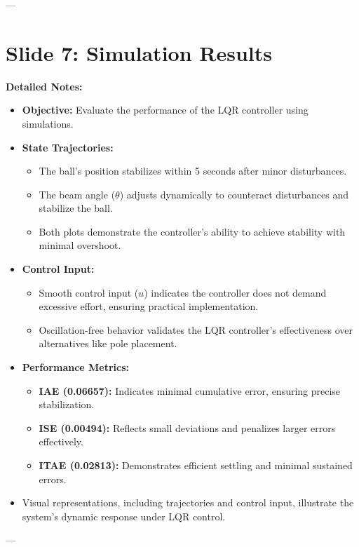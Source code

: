 \documentclass[12pt]{article}
\begin{document}
---
\newpage
\section*{Slide 7: Simulation Results}
\textbf{Detailed Notes:}
\begin{itemize}
    \item \textbf{Objective:} Evaluate the performance of the LQR controller using simulations.
    \item \textbf{State Trajectories:}
    \begin{itemize}
        \item The ball’s position stabilizes within 5 seconds after minor disturbances.
        \item The beam angle (\(\theta\)) adjusts dynamically to counteract disturbances and stabilize the ball.
        \item Both plots demonstrate the controller’s ability to achieve stability with minimal overshoot.
    \end{itemize}
    \item \textbf{Control Input:}
    \begin{itemize}
        \item Smooth control input (\(u\)) indicates the controller does not demand excessive effort, ensuring practical implementation.
        \item Oscillation-free behavior validates the LQR controller's effectiveness over alternatives like pole placement.
    \end{itemize}
    \item \textbf{Performance Metrics:}
    \begin{itemize}
        \item \textbf{IAE (0.06657):} Indicates minimal cumulative error, ensuring precise stabilization.
        \item \textbf{ISE (0.00494):} Reflects small deviations and penalizes larger errors effectively.
        \item \textbf{ITAE (0.02813):} Demonstrates efficient settling and minimal sustained errors.
    \end{itemize}
    \item Visual representations, including trajectories and control input, illustrate the system’s dynamic response under LQR control.
\end{itemize}

---
\end{document}
